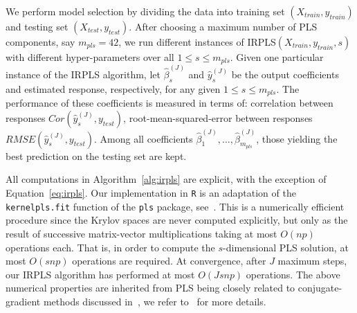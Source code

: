 \documentclass[12pt]{article}
\renewcommand{\cite}{\citep}
\newcommand{\biblist}{


}
\begin{document}
{We perform model selection by dividing the data into training set $(X_{train},y_{train})$ and testing set $(X_{test},y_{test})$. After choosing a maximum number of PLS components, say $m_{pls}=42$, we run different instances of IRPLS$(X_{train},y_{train},s)$ with different hyper-parameters over all $1\leq s\leq m_{pls}$. Given one particular instance of the IRPLS algorithm, let $\widehat\beta_{s}^{(J)}$ and $\widehat y_{s}^{(J)}$ be the output coefficients and estimated response, respectively, for any given $1\leq s\leq m_{pls}$. The performance of these coefficients is measured in terms of: correlation between responses $Cor(\widehat y_{s}^{(J)},y_{test})$, root-mean-squared-error between responses $RMSE(\widehat y_{s}^{(J)},y_{test})$. Among all coefficients $\widehat\beta_1^{(J)},\ldots,\widehat\beta_{m_{pls}}^{(J)}$, those yielding the best prediction on the testing set are kept.

All computations in Algorithm~\ref{alg:irpls} are explicit, with the exception of Equation~\eqref{eq:irpls}. Our implementation in \texttt{R} is an adaptation of the \texttt{kernelpls.fit} function of the \texttt{pls} package, see~\cite{pls}. This is a numerically efficient procedure since the Krylov spaces are never computed explicitly, but only as the result of successive matrix-vector multiplications taking at most $O(np)$ operations each. That is, in order to compute the $s$-dimensional PLS solution, at most $O(snp)$ operations are required. At convergence, after $J$ maximum steps, our IRPLS algorithm has performed at most $O(Jsnp)$ operations. The above numerical properties are inherited from PLS being closely related to conjugate-gradient methods discussed in~\cite{nemirovskii1986reg,hanke1995conj}, we refer to~\cite{singer2016partial} for more details. 



}

\biblist
\end{document}

